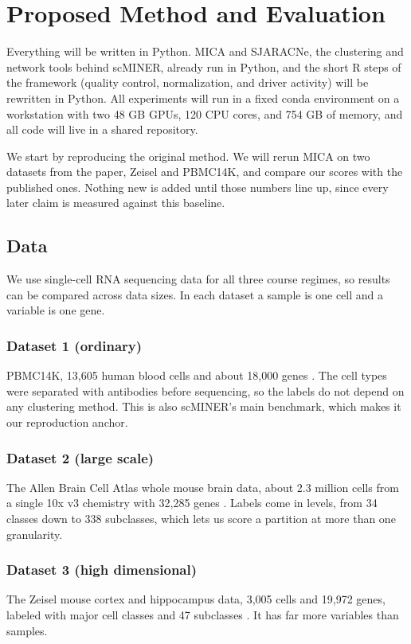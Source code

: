 \section{Proposed Method and Evaluation}
Everything will be written in Python. MICA and SJARACNe, the clustering and network tools behind scMINER, already run in Python, and the short R steps of the framework (quality control, normalization, and driver activity) will be rewritten in Python. All experiments will run in a fixed conda environment on a workstation with two 48 GB GPUs, 120 CPU cores, and 754 GB of memory, and all code will live in a shared repository.

We start by reproducing the original method. We will rerun MICA on two datasets from the paper, Zeisel and PBMC14K, and compare our scores with the published ones. Nothing new is added until those numbers line up, since every later claim is measured against this baseline.

\subsection{Data}
We use single-cell RNA sequencing data for all three course regimes, so results can be compared across data sizes. In each dataset a sample is one cell and a variable is one gene.

\subsubsection{Dataset 1 (ordinary)}
PBMC14K, 13,605 human blood cells and about 18,000 genes \cite{zheng2017massively}. The cell types were separated with antibodies before sequencing, so the labels do not depend on any clustering method. This is also scMINER's main benchmark, which makes it our reproduction anchor.

\subsubsection{Dataset 2 (large scale)}
The Allen Brain Cell Atlas whole mouse brain data, about 2.3 million cells from a single 10x v3 chemistry with 32,285 genes \cite{yao2023allen}. Labels come in levels, from 34 classes down to 338 subclasses, which lets us score a partition at more than one granularity.

\subsubsection{Dataset 3 (high dimensional)}
The Zeisel mouse cortex and hippocampus data, 3,005 cells and 19,972 genes, labeled with major cell classes and 47 subclasses \cite{zeisel2015cell}. It has far more variables than samples.

